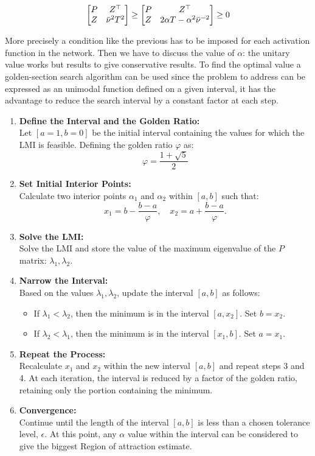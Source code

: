 \documentclass{article}
\begin{document}
$$
  \left[\begin{matrix}P & Z^\top\\
  Z & \bar{\nu}^{2} T^{2}\end{matrix}\right] \geq \left[\begin{matrix}
    P & Z^\top\\
    Z & 2 \alpha T - \alpha^{2} \bar{\nu}^{-2}
  \end{matrix}\right] \geq 0
$$

More precisely a condition like the previous has to be imposed for each activation function in the network. Then we have to discuss the value of $\alpha$: the unitary value works but results to give conservative results. To find the optimal value a golden-section search algorithm can be used since the problem to address can be expressed as an unimodal function defined on a given interval, it has the advantage to reduce the search interval by a constant factor at each step.

\begin{enumerate}
    \item \textbf{Define the Interval and the Golden Ratio:} \\
    Let $[a = 1, b = 0]$ be the initial interval containing the values for which the LMI is feasible. Defining the golden ratio $\varphi$ as:
    $$
    \varphi = \frac{1 + \sqrt{5}}{2}
    $$
    
    \item \textbf{Set Initial Interior Points:} \\
    Calculate two interior points $ \alpha_1 $ and $ \alpha_2 $ within $[a, b]$ such that:
    $$
    x_1 = b - \frac{b - a}{\varphi}, \quad x_2 = a + \frac{b - a}{\varphi}.
    $$
    
    \item \textbf{Solve the LMI:} \\
    Solve the LMI and store the value of the maximum eigenvalue of the $P$ matrix: $ \lambda_1, \lambda_2 $.
    
    \item \textbf{Narrow the Interval:} \\
    Based on the values $ \lambda_1, \lambda_2$, update the interval $[a, b]$ as follows:
    \begin{itemize}
        \item If $ \lambda_1 < \lambda_2 $, then the minimum is in the interval $[a, x_2]$. Set $ b = x_2 $.
        \item If $ \lambda_2 < \lambda_1 $, then the minimum is in the interval $[x_1, b]$. Set $ a = x_1 $.
    \end{itemize}
    
    \item \textbf{Repeat the Process:} \\
    Recalculate $ x_1 $ and $ x_2 $ within the new interval $[a, b]$ and repeat steps 3 and 4. At each iteration, the interval is reduced by a factor of the golden ratio, retaining only the portion containing the minimum.
    
    \item \textbf{Convergence:} \\
    Continue until the length of the interval $[a, b]$ is less than a chosen tolerance level, $\epsilon$. At this point, any $\alpha$ value within the interval can be considered to give the biggest Region of attraction estimate.
\end{enumerate}
\end{document}
